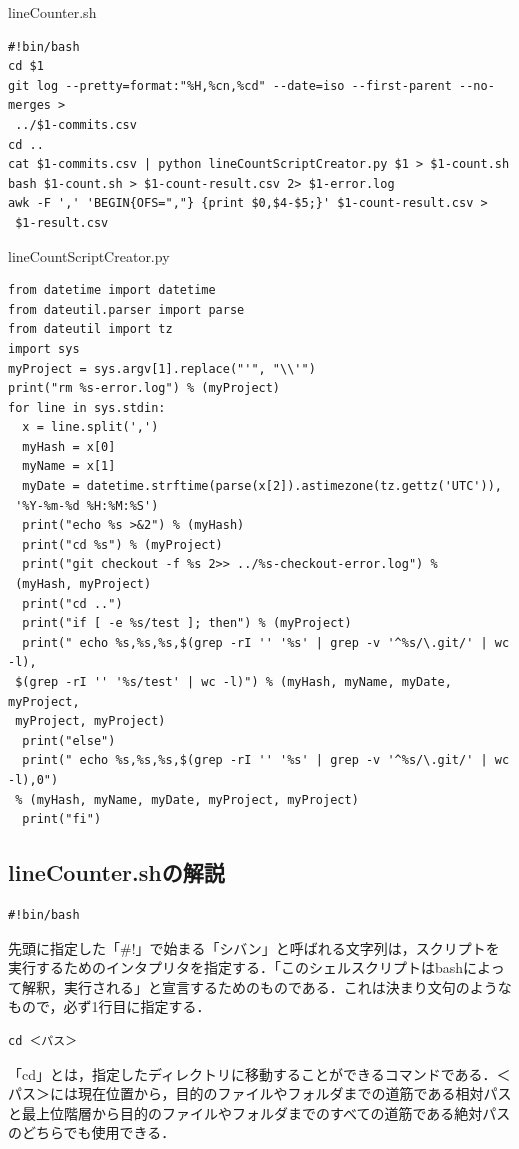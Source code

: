 lineCounter.sh
\begin{lstlisting}[basicstyle=\ttfamily\footnotesize, frame=single]
#!bin/bash
cd $1
git log --pretty=format:"%H,%cn,%cd" --date=iso --first-parent --no-merges >
 ../$1-commits.csv
cd ..
cat $1-commits.csv | python lineCountScriptCreator.py $1 > $1-count.sh
bash $1-count.sh > $1-count-result.csv 2> $1-error.log
awk -F ',' 'BEGIN{OFS=","} {print $0,$4-$5;}' $1-count-result.csv >
 $1-result.csv
\end{lstlisting}

\hfil
lineCountScriptCreator.py
\begin{lstlisting}[basicstyle=\ttfamily\footnotesize, frame=single]
from datetime import datetime
from dateutil.parser import parse
from dateutil import tz
import sys
myProject = sys.argv[1].replace("'", "\\'")
print("rm %s-error.log") % (myProject)
for line in sys.stdin:
  x = line.split(',')
  myHash = x[0]
  myName = x[1]
  myDate = datetime.strftime(parse(x[2]).astimezone(tz.gettz('UTC')),
 '%Y-%m-%d %H:%M:%S')
  print("echo %s >&2") % (myHash)
  print("cd %s") % (myProject)
  print("git checkout -f %s 2>> ../%s-checkout-error.log") %
 (myHash, myProject)
  print("cd ..")
  print("if [ -e %s/test ]; then") % (myProject)
  print(" echo %s,%s,%s,$(grep -rI '' '%s' | grep -v '^%s/\.git/' | wc -l),
 $(grep -rI '' '%s/test' | wc -l)") % (myHash, myName, myDate, myProject,
 myProject, myProject)
  print("else")
  print(" echo %s,%s,%s,$(grep -rI '' '%s' | grep -v '^%s/\.git/' | wc -l),0") 
 % (myHash, myName, myDate, myProject, myProject)
  print("fi")
\end{lstlisting}

\newpage

\subsection{lineCounter.shの解説}
\begin{lstlisting}[basicstyle=\ttfamily\footnotesize, frame=single]
#!bin/bash
\end{lstlisting}
先頭に指定した「\#!」で始まる「シバン」と呼ばれる文字列は，スクリプトを実行するためのインタプリタを指定する．「このシェルスクリプトはbashによって解釈，実行される」と宣言するためのものである．これは決まり文句のようなもので，必ず1行目に指定する．

\hfil
\begin{lstlisting}[basicstyle=\ttfamily\footnotesize, frame=single]
cd ＜パス＞
\end{lstlisting}
「cd」とは，指定したディレクトリに移動することができるコマンドである．＜パス＞には現在位置から，目的のファイルやフォルダまでの道筋である相対パスと最上位階層から目的のファイルやフォルダまでのすべての道筋である絶対パスのどちらでも使用できる．

